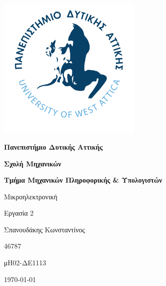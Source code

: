 \gr
\begin{titlepage}
	\begin{center}
		\includegraphics[width=7cm]{Images/uniwa_logo}
			
		\Huge
		\textbf{Πανεπιστήμιο Δυτικής Αττικής}
		
		\vspace{0.5cm}
		
		\Large
		\textbf{Σχολή Μηχανικών}
		
		\vspace{0.2cm}
		
		\Large
		\textbf{Τμήμα Μηχανικών Πληροφορικής \& Υπολογιστών}
		
		\vspace{3cm}
		\Huge
		Μικροηλεκτρονική
		
		\vspace{0.4cm}
		\LARGE
		Εργασία 2
		
		\vspace{4cm}
		Σπανουδάκης Κωνσταντίνος 
		
		\vspace{0.2cm}
		46787

		\vspace{0.2cm} %
		μΗ02-ΔΕ1113 				
		
		\vspace{0.2cm}
		\today
	\end{center}
\end{titlepage}
